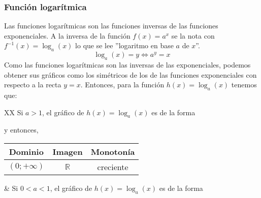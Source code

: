 \documentclass[Análisis.root.tex]{subfiles}
\newcommand{\R}{\mathbb{R}}
\begin{document}
        \subsubsection{Función logarítmica}
        Las funciones logarítmicas son las funciones inversas de las funciones exponenciales. A la inversa de la función \(f(x) = a^x\) se la nota con \(f^{−1}(x) = \log_a(x)\) lo que se lee ”logaritmo en base \(a\) de \(x\)”.
        \[\log_a(x)=y\Longleftrightarrow a^y=x\]
        Como las funciones logarítmicas son las inversas de las exponenciales, podemos obtener sus gráficos como los simétricos de los de las funciones exponenciales con respecto a la recta \(y = x\). Entonces, para la función \(h(x) = \log_a(x)\) tenemos que:\\
        \begin{tabularx}{\textwidth}{XX}
            Si \(a>1\), el gráfico de \(h(x)=\log_a(x)\) es de la forma
            \begin{center}
                \begin{tikzpicture}
                    \begin{axis}[
                        scale=0.8,
                        axis lines = middle,
                        axis equal,
                        xlabel = \(x\),
                        ylabel = {\(y\)},
                        domain=-5:5,
                        samples= 100,
                        ymin=-4,
                        ymax=2
                    ]
                    \addplot[color=blue] {Log(2,\x)};
                    \addlegendentry{\(\log_2(x)\)}
                    \end{axis}
                \end{tikzpicture} 
            \end{center} y entonces,
            \begin{center}
                \begin{tabular}{|c|c|c|}
                    \hline
                    Dominio & Imagen & Monotonía\\\hline
                    \((0;+\infty)\) & \(\R\) & creciente\\
                    \hline
                \end{tabular}
            \end{center}
            &
            Si \(0<a<1\), el gráfico de \(h(x)=\log_a(x)\) es de la forma
            \begin{center}
                \begin{tikzpicture}

\end{tikzpicture}
\end{center}
\end{tabularx}
\end{document}
